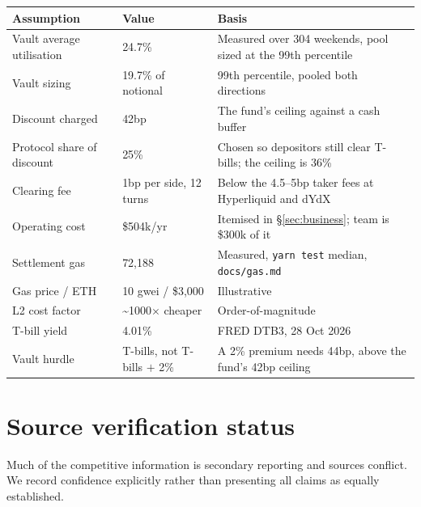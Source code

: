 \documentclass[11pt,a4paper]{article}
\begin{document}
\begin{center}
\small
\begin{tabular}{@{}p{4.1cm}p{3.3cm}p{7.6cm}@{}}
\toprule
\textbf{Assumption} & \textbf{Value} & \textbf{Basis} \\
\midrule
Vault average utilisation & 24.7\% & Measured over 304 weekends, pool sized at the 99th percentile \\
Vault sizing & 19.7\% of notional & 99th percentile, pooled both directions \\
Discount charged & 42bp & The fund's ceiling against a cash buffer \\
Protocol share of discount & 25\% & Chosen so depositors still clear T-bills; the ceiling is 36\% \\
Clearing fee & 1bp per side, 12 turns & Below the 4.5--5bp taker fees at Hyperliquid and dYdX \cite{hlfees} \\
Operating cost & \$504k/yr & Itemised in \S\ref{sec:business}; team is \$300k of it \\
Settlement gas & 72,188 & Measured, \texttt{yarn test} median, \texttt{docs/gas.md} \\
Gas price / ETH & 10 gwei / \$3,000 & Illustrative \\
L2 cost factor & \textasciitilde1000\(\times\) cheaper & Order-of-magnitude \\
T-bill yield & 4.01\% & FRED DTB3, 28 Oct 2026 \\
Vault hurdle & T-bills, not T-bills $+$ 2\% & A 2\% premium needs 44bp, above the fund's 42bp ceiling \\
\bottomrule
\end{tabular}
\end{center}

\section{Source verification status}

Much of the competitive information is secondary reporting and sources conflict. We record
confidence explicitly rather than presenting all claims as equally established.
\end{document}
